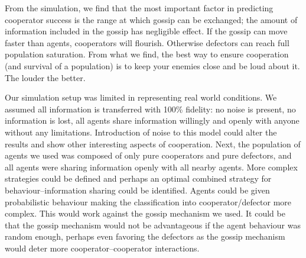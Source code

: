 \documentclass[english]{article}
\begin{document}
From the simulation, we find that the most important factor in predicting cooperator success is the range at which gossip can be exchanged; the amount of information included in the gossip has negligible effect.
If the gossip can move faster than agents, cooperators will flourish.  Otherwise defectors can reach full population saturation.
From what we find, the best way to ensure cooperation (and survival of a population) is to keep your enemies close and be loud about it.
The louder the better.

Our simulation setup was limited in representing real world conditions.
We assumed all information is transferred with 100\% fidelity: no noise is present, no information is lost, all agents share information willingly and openly with anyone without any limitations. Introduction of noise to this model could alter the results and show other interesting aspects of cooperation.
Next, the population of agents we used was composed of only pure cooperators and pure defectors, and all agents were sharing information openly with all nearby agents.
More complex strategies could be defined and perhaps an optimal combined strategy for behaviour--information sharing could be identified.
Agents could be given probabilistic behaviour making the classification into cooperator/defector more complex. This would work against the gossip mechanism we used.
It could be that the gossip mechanism would not be advantageous if the agent behaviour was random enough, perhaps even favoring the defectors as the gossip mechanism would deter more cooperator--cooperator interactions.



\pagebreak

\end{document}

